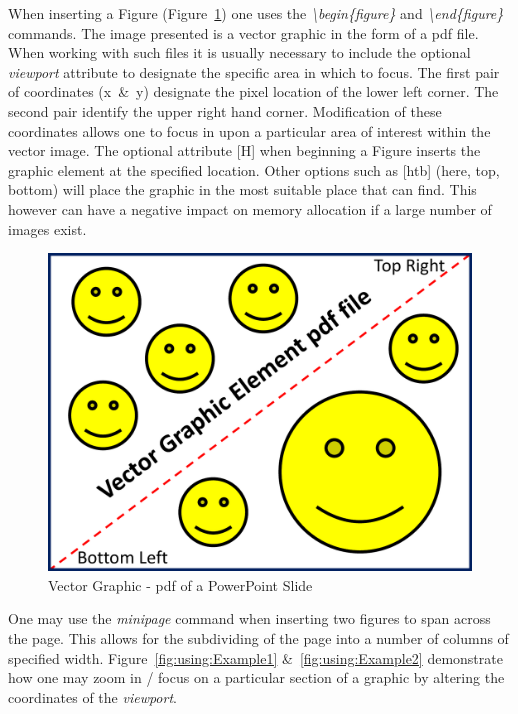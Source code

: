 When inserting a Figure (Figure~\ref{fig:using:VectorGraphicElementPDF}) one uses the \emph{\textbackslash begin\{figure\}} and \emph{\textbackslash end\{figure\}} commands. The image presented is a vector graphic in the form of a pdf file. When working with such files it is usually necessary to include the optional \emph{viewport} attribute to designate the specific area in which to focus. The first pair of coordinates (x~\&~y) designate the pixel location of the lower left corner. The second pair identify the upper right hand corner. Modification of these coordinates allows one to focus in upon a particular area of interest within the vector image. The optional attribute [H] when beginning a Figure inserts the graphic element at the specified location. Other options such as [htb] (here, top, bottom) will place the graphic in the most suitable place that \latex can find. This however can have a negative impact on memory allocation if a large number of images exist.


\begin{figure}[H]
\centering
\includegraphics[width=.4\linewidth]{usingLatex/images/VectorGraphicElementPDF.pdf}
\caption{Vector Graphic - pdf of a PowerPoint Slide}
\label{fig:using:VectorGraphicElementPDF}
\end{figure}

One may use the \emph{minipage} command when inserting two figures to span across the page. This allows for the subdividing of the page into a number of columns of specified width. Figure~\ref{fig:using:Example1} \&~\ref{fig:using:Example2} demonstrate how one may zoom in / focus on a particular section of a graphic by altering the coordinates of the \emph{viewport}. 

